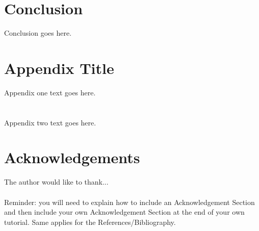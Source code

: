 \documentclass[12pt,journal,compsoc]{IEEEtran}
\begin{document}


\section{Conclusion}
Conclusion goes here.

\appendices
\section{Appendix Title}
Appendix one text goes here.

\section{}
Appendix two text goes here.


\section*{Acknowledgements}

The author would like to thank...\\ \\

Reminder: you will need to explain how to include an Acknowledgement Section and then include your own Acknowledgement Section at the end of your own tutorial. Same applies for the References/Bibliography.



\end{document}

